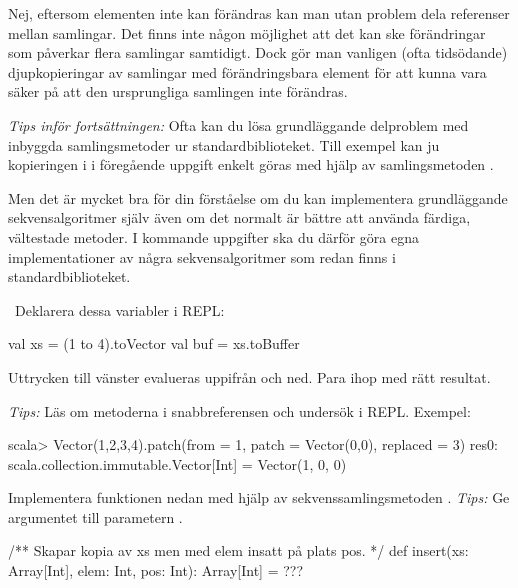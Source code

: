 \SubtaskSolved Nej, eftersom elementen inte kan förändras kan man utan problem dela referenser mellan samlingar. Det finns inte någon möjlighet att det kan ske förändringar som påverkar flera samlingar samtidigt.
Dock gör man vanligen (ofta tidsödande) djupkopieringar av samlingar med förändringsbara element för att kunna vara säker på att den ursprungliga samlingen inte förändras.

\QUESTEND



\ifPreSolution
\begin{framed}
\noindent\emph{Tips inför fortsättningen:} Ofta kan du lösa grundläggande delproblem med inbyggda samlingsmetoder ur standardbiblioteket. Till exempel kan ju kopieringen i  i föregående uppgift enkelt göras med hjälp av samlingsmetoden .

Men det är mycket bra för din förståelse om du kan implementera grundläggande sekvensalgoritmer själv även om det normalt är bättre att använda färdiga, vältestade  metoder. I kommande uppgifter ska du därför göra egna implementationer av några sekvensalgoritmer som redan finns i standardbiblioteket.
\end{framed}
\fi




\QUESTBEGIN

\Task \what~Deklarera dessa variabler i REPL:

\begin{Code}
val xs = (1 to 4).toVector
val buf = xs.toBuffer
\end{Code}

\Subtask Uttrycken till vänster evalueras uppifrån och ned. Para ihop med rätt resultat.

\begin{ConceptConnections}

\end{ConceptConnections}
\emph{Tips:} Läs om metoderna i snabbreferensen och undersök i REPL. Exempel:
\begin{REPL}
scala> Vector(1,2,3,4).patch(from = 1, patch = Vector(0,0), replaced = 3)
res0: scala.collection.immutable.Vector[Int] = Vector(1, 0, 0)
\end{REPL}

\Subtask Implementera funktionen  nedan med hjälp av sekvenssamlingsmetoden . \emph{Tips:} Ge argumentet  till parametern .
\begin{Code}
/** Skapar kopia av xs men med elem insatt på plats pos. */
def insert(xs: Array[Int], elem: Int, pos: Int): Array[Int] = ???
\end{Code}

